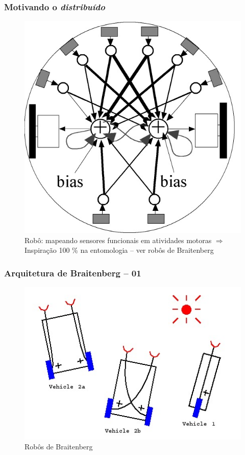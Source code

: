 \begin{frame} %

  \frametitle{Motivando o \textit{distribuído}}
        
\begin{figure}[!ht]
\centering
\includegraphics[height =.5\textheight,width=.4\textwidth]{figuras/DAI_motivation03.jpg}
\caption{Robô: mapeando sensores funcionais em atividades motoras $\Rightarrow$ Inspiração 100 \% na entomologia -- ver robôs de Braitenberg}
\end{figure}
    
\end{frame}





\begin{frame} %

  \frametitle{Arquitetura de  Braitenberg -- 01}
        
\begin{figure}[!ht]
\centering
\includegraphics[height =.5\textheight,width=.6\textwidth]{figuras/braitember01.jpg}
\caption{Robôs de Braitenberg}
\end{figure}
    
\end{frame}

